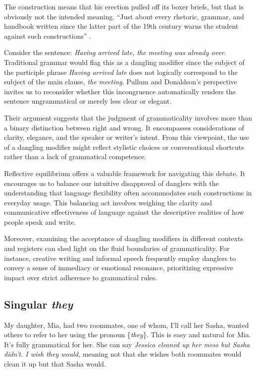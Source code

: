 The construction means that his erection pulled off its boxer briefs, but that is obviously not the intended meaning. ``Just about every rhetoric, grammar, and handbook written since the latter part of the 19th century warns the student against such constructions'' \citep[314]{Gilman1989}.

Consider the sentence: \textit{Having arrived late, the meeting was already over.} Traditional grammar would flag this as a dangling modifier since the subject of the participle phrase \textit{Having arrived late} does not logically correspond to the subject of the main clause, \textit{the meeting}. Pullum and Donaldson's perspective invites us to reconsider whether this incongruence automatically renders the sentence ungrammatical or merely less clear or elegant.

Their argument suggests that the judgment of grammaticality involves more than a binary distinction between right and wrong. It encompasses considerations of clarity, elegance, and the speaker or writer's intent. From this viewpoint, the use of a dangling modifier might reflect stylistic choices or conversational shortcuts rather than a lack of grammatical competence.

Reflective equilibrium offers a valuable framework for navigating this debate. It encourages us to balance our intuitive disapproval of danglers with the understanding that language flexibility often accommodates such constructions in everyday usage. This balancing act involves weighing the clarity and communicative effectiveness of language against the descriptive realities of how people speak and write.

Moreover, examining the acceptance of dangling modifiers in different contexts and registers can shed light on the fluid boundaries of grammaticality. For instance, creative writing and informal speech frequently employ danglers to convey a sense of immediacy or emotional resonance, prioritizing expressive impact over strict adherence to grammatical rules.

\subsection{Singular \textit{they}}

My daughter, Mia, had two roommates, one of whom, I'll call her Sasha, wanted others to refer to her using the pronoun \{\textit{they}\}. This is easy and natural for Mia. It's fully grammatical for her. She can say \textit{Jessica cleaned up her mess but Sasha didn't. I wish they would,} meaning not that she wishes both roommates would clean it up but that Sasha would.

